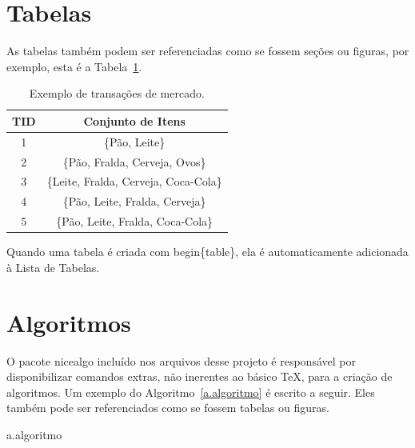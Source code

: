 \section{Tabelas}
\label{s.tabelas}

As tabelas também podem ser referenciadas como se fossem seções ou figuras, por exemplo, esta é a Tabela~\ref{t.transacao_mercado}.

\begin{table}[h]
\centering
\begin{tabular}{c|c}
\hline
\textbf{\small TID} & \textbf{\small Conjunto de Itens}\\\hline \hline
{\small 1} & {\small \{Pão, Leite\}}\\\hline
{\small 2} & {\small \{Pão, Fralda, Cerveja, Ovos\}}\\\hline
{\small 3} & {\small \{Leite, Fralda, Cerveja, Coca-Cola\}}\\\hline
{\small 4} & {\small \{Pão, Leite, Fralda, Cerveja\}}\\\hline
{\small 5} & {\small \{Pão, Leite, Fralda, Coca-Cola\}}\\\hline
\end{tabular}
\caption{Exemplo de transações de mercado.}
\label{t.transacao_mercado}
\end{table}

Quando uma tabela é criada com begin\{table\}, ela é automaticamente adicionada à Lista de Tabelas.

\section{Algoritmos}
\label{s.algoritmos}

O pacote nicealgo incluído nos arquivos desse projeto é responsável por disponibilizar comandos extras, não inerentes ao básico TeX, para a criação de algoritmos. Um exemplo do Algoritmo~\ref{a.algoritmo} é escrito a seguir. Eles também pode ser referenciados como se fossem tabelas ou figuras.

\begin{nicealgo}{a.algoritmo}
\naPREAMBLE
{}
\naBODY
{}
\naEND{}
\naEND{}
\naEND{}
\naEND{}
\naEND{}
\end{nicealgo}

